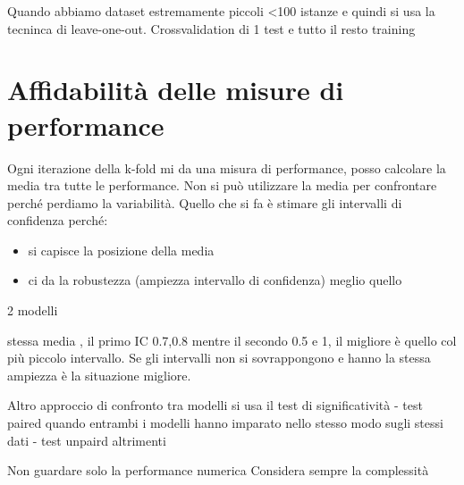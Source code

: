 Quando abbiamo dataset estremamente piccoli <100 istanze e quindi si usa la tecninca
di leave-one-out. Crossvalidation di 1 test e tutto il resto training

\section{Affidabilità delle misure di performance}
Ogni iterazione della k-fold mi da una misura di performance, posso calcolare la media
tra tutte le performance. Non si può utilizzare la media per confrontare perché 
perdiamo la variabilità. Quello che si fa è stimare gli intervalli di confidenza
perché:
\begin{itemize}
    \item si capisce la posizione della media
    \item ci da la robustezza  (ampiezza intervallo di confidenza) meglio quello
\end{itemize}
2 modelli

stessa media , il primo IC 0.7,0.8 mentre il secondo 0.5 e 1, il migliore è quello
col più piccolo intervallo. Se gli intervalli non si sovrappongono e hanno la 
stessa ampiezza è la situazione migliore.

Altro approccio di confronto tra modelli si usa il test di significatività 
- test paired quando entrambi i modelli hanno imparato nello stesso modo sugli stessi dati
- test unpaird altrimenti

Non guardare solo la performance numerica
Considera sempre la complessità